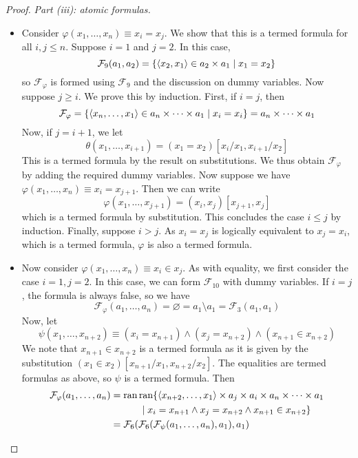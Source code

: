 \begin{proof}
    \emph{Part (iii): atomic formulas.}
    \begin{itemize}
        \item Consider \( \varphi(x_1, \dots, x_n) \equiv x_i = x_j \).
        We show that this is a termed formula for all \( i, j \leq n \).
        Suppose \( i = 1 \) and \( j = 2 \).
        In this case,
        \[ \mathcal F_9(a_1, a_2) = \qty{\langle x_2, x_1 \rangle \in a_2 \times a_1 \mid x_1 = x_2} \]
        so \( \mathcal F_\varphi \) is formed using \( \mathcal F_9 \) and the discussion on dummy variables.
        Now suppose \( j \geq i \).
        We prove this by induction.
        First, if \( i = j \), then
        \[ \mathcal F_\varphi = \qty{\langle x_n, \dots, x_1 \rangle \in a_n \times \dots \times a_1 \mid x_i = x_i} = a_n \times \dots \times a_1 \]
        Now, if \( j = i + 1 \), we let
        \[ \theta(x_1, \dots, x_{i+1}) = (x_1 = x_2)[x_i/x_1, x_{i+1}/x_2] \]
        This is a termed formula by the result on substitutions.
        We thus obtain \( \mathcal F_\varphi \) by adding the required dummy variables.
        Now suppose we have \( \varphi(x_1, \dots, x_n) \equiv x_i = x_{j+1} \).
        Then we can write
        \[ \varphi(x_1, \dots, x_{j+1}) = (x_i, x_j)[x_{j+1}, x_j] \]
        which is a termed formula by substitution.
        This concludes the case \( i \leq j \) by induction.
        Finally, suppose \( i > j \).
        As \( x_i = x_j \) is logically equivalent to \( x_j = x_i \), which is a termed formula, \( \varphi \) is also a termed formula.
        \item Now consider \( \varphi(x_1, \dots, x_n) \equiv x_i \in x_j \).
        As with equality, we first consider the case \( i = 1, j = 2 \).
        In this case, we can form \( \mathcal F_{10} \) with dummy variables.
        If \( i = j \), the formula is always false, so we have
        \[ \mathcal F_\varphi(a_1, \dots, a_n) = \varnothing = a_1 \setminus a_1 = \mathcal F_3(a_1, a_1) \]
        Now, let
        \[ \psi(x_1, \dots, x_{n+2}) \equiv (x_i = x_{n+1}) \wedge (x_j = x_{n+2}) \wedge (x_{n+1} \in x_{n+2}) \]
        We note that \( x_{n+1} \in x_{n+2} \) is a termed formula as it is given by the substitution \( (x_1 \in x_2)[x_{n+1}/x_1, x_{n+2}/x_2] \).
        The equalities are termed formulas as above, so \( \psi \) is a termed formula.
        Then
        \begin{align*}
            \mathcal F_\varphi(a_1, \dots, a_n) &= \operatorname{ran}\operatorname{ran}\{\langle x_{n+2}, \dots, x_1\rangle \times a_j \times a_i \times a_n \times \dots \times a_1 \\&\quad\quad\quad\mid x_i = x_{n+1} \wedge x_j = x_{n+2} \wedge x_{n+1} \in x_{n+2}\} \\
            &= \mathcal F_6(\mathcal F_6(\mathcal F_\psi(a_1, \dots, a_n), a_1), a_1)
        \end{align*}
    \end{itemize}


\end{proof}
